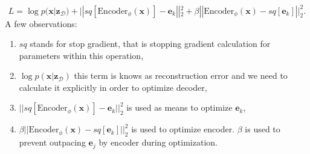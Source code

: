\documentclass[10pt]{article}
\begin{document}
\begin{equation}
    L = \log p(\textbf{x}|\textbf{z}_\mathcal{D}) + 
    ||  sq[\text{Encoder}_{\phi}(\textbf{x})] - \textbf{e}_k||_2^2 +
    \beta || \text{Encoder}_{\phi}(\textbf{x}) - sq[\textbf{e}_k]||_2^2.
\end{equation}
A few observations:
\begin{enumerate}
    \item $sq$ stands for stop gradient, that is stopping gradient calculation for parameters within this operation,
    \item $\log p(\textbf{x}|\textbf{z}_\mathcal{D} )$ this term is knows as reconstruction error and we need to calculate it explicitly in order to optimize decoder,
    \item  $||  sq[\text{Encoder}_{\phi}(\textbf{x})] - \textbf{e}_k||_2^2 $ is used as means to optimize $\textbf{e}_k$,
    \item $\beta || \text{Encoder}_{\phi}(\textbf{x}) - sq[\textbf{e}_k]||_2^2$ is used to optimize encoder.  $\beta$ is used to prevent outpacing $\textbf{e}_j$ by encoder during optimization.
\end{enumerate}
\end{document}
